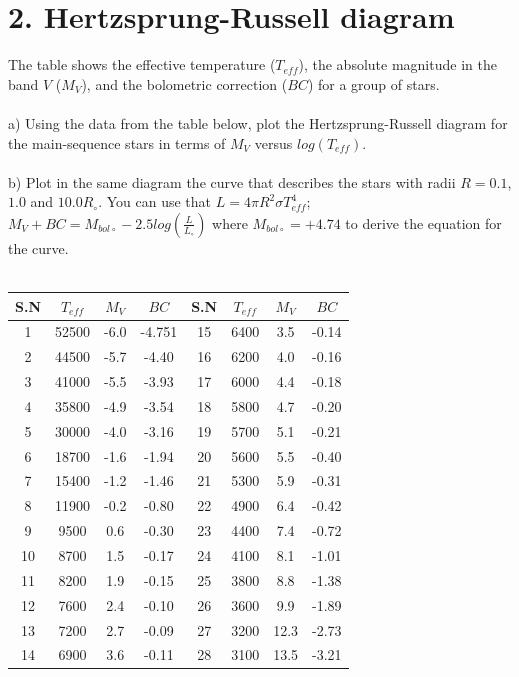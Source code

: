\section*{2. Hertzsprung-Russell diagram}

The table shows the effective temperature ($T_{eff}$), the absolute magnitude in the band $V$ ($M_V$),
and the bolometric correction ($BC$) for a group of stars.\\
\\
a) Using the data from the table below, plot the Hertzsprung-Russell diagram for the main-sequence stars
in terms of $M_V$ versus $log(T_{eff})$.\\
\\
b) Plot in the same diagram the curve that describes the stars with radii $R = 0.1$, $1.0$ and 
$10.0 R_\circ$. You can use that 
$L = 4 \pi R^2 \sigma T^4_{eff}$; $M_V + BC = M_{bol \circ} - 2.5 log(\frac{L}{L_\circ})$ where 
$M_{bol \circ} = + 4.74$ to derive the equation for the curve.\\
\\
\begin{center}
  \begin{tabular}{||c|c|c|c||c|c|c|c||}
        \hline
    S.N & $T_{eff}$ & $M_V$ & $BC$ & S.N & $T_{eff}$ & $M_V$ & $BC$\\
        \hline
    1 & 52500 & -6.0 & -4.751 & 15 & 6400 & 3.5 & -0.14\\
    2 & 44500 & -5.7 & -4.40 & 16 & 6200 & 4.0 & -0.16\\
    3 & 41000 & -5.5 & -3.93 & 17 & 6000 & 4.4 & -0.18\\
    4 & 35800 & -4.9 & -3.54 & 18 & 5800 & 4.7 & -0.20\\
    5 & 30000 & -4.0 & -3.16 & 19 & 5700 & 5.1 & -0.21\\
    6 & 18700 & -1.6 & -1.94 & 20 & 5600 & 5.5 & -0.40\\
    7 & 15400 & -1.2 & -1.46 & 21 & 5300 & 5.9 & -0.31\\
    8 & 11900 & -0.2 & -0.80 & 22 & 4900 & 6.4 & -0.42\\
    9 & 9500 & 0.6 & -0.30 & 23 & 4400 & 7.4 & -0.72\\
    10 & 8700 & 1.5 & -0.17 & 24 & 4100 & 8.1 & -1.01\\
    11 & 8200 & 1.9 & -0.15 & 25 & 3800 & 8.8 & -1.38\\
    12 & 7600 & 2.4 & -0.10 & 26 & 3600 & 9.9 & -1.89\\
    13 & 7200 & 2.7 & -0.09 & 27 & 3200 & 12.3 & -2.73\\
    14 & 6900 & 3.6 & -0.11 & 28 & 3100 & 13.5 & -3.21\\
        \hline
    \end{tabular}
\end{center}

\noindent{}\\
